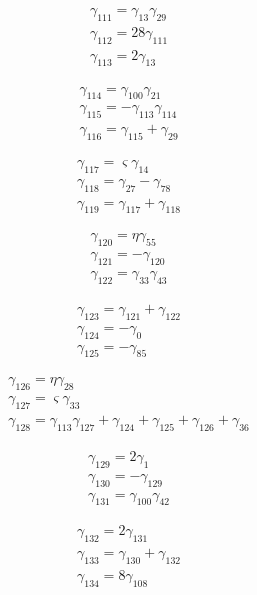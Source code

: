 \[\begin{aligned}\gamma_{111}=\gamma_{13} \gamma_{29}\\ \gamma_{112}=28 \gamma_{111}\\ \gamma_{113}=2 \gamma_{13}\end{aligned}\]

\[\begin{aligned}\gamma_{114}=\gamma_{100} \gamma_{21}\\ \gamma_{115}=- \gamma_{113} \gamma_{114}\\ \gamma_{116}=\gamma_{115} + \gamma_{29}\end{aligned}\]

\[\begin{aligned}\gamma_{117}=\varsigma  \gamma_{14}\\ \gamma_{118}=\gamma_{27} - \gamma_{78}\\ \gamma_{119}=\gamma_{117} + \gamma_{118}\end{aligned}\]

\[\begin{aligned}\gamma_{120}=\eta  \gamma_{55}\\ \gamma_{121}=- \gamma_{120}\\ \gamma_{122}=\gamma_{33} \gamma_{43}\end{aligned}\]

\[\begin{aligned}\gamma_{123}=\gamma_{121} + \gamma_{122}\\ \gamma_{124}=- \gamma_{0}\\ \gamma_{125}=- \gamma_{85}\end{aligned}\]

\[\begin{aligned}\gamma_{126}=\eta  \gamma_{28}\\ \gamma_{127}=\varsigma  \gamma_{33}\\ \gamma_{128}=\gamma_{113} \gamma_{127} + \gamma_{124} + \gamma_{125} + \gamma_{126} + \gamma_{36}\end{aligned}\]

\[\begin{aligned}\gamma_{129}=2 \gamma_{1}\\ \gamma_{130}=- \gamma_{129}\\ \gamma_{131}=\gamma_{100} \gamma_{42}\end{aligned}\]

\[\begin{aligned}\gamma_{132}=2 \gamma_{131}\\ \gamma_{133}=\gamma_{130} + \gamma_{132}\\ \gamma_{134}=8 \gamma_{108}\end{aligned}\]

